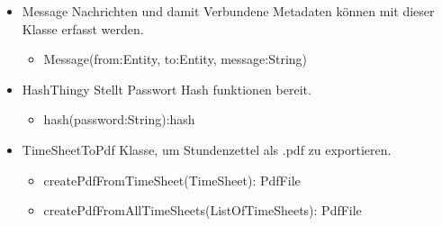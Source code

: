 \begin{itemize}
\begin{itemize}
            \item{Message}
                Nachrichten und damit Verbundene Metadaten können mit dieser Klasse erfasst werden.
                \begin{itemize}
                    \item{Message(from:Entity, to:Entity, message:String)}
                \end{itemize}

            \item{HashThingy}
                Stellt Passwort Hash funktionen bereit.
                \begin{itemize}
                    \item{hash(password:String):hash}
                \end{itemize}

            \item{TimeSheetToPdf}
                Klasse, um Stundenzettel als .pdf zu exportieren.
                \begin{itemize}
                    \item{createPdfFromTimeSheet(TimeSheet): PdfFile}
                    \item{createPdfFromAllTimeSheets(ListOfTimeSheets): PdfFile}
                \end{itemize}

        \end{itemize}


\end{itemize}

